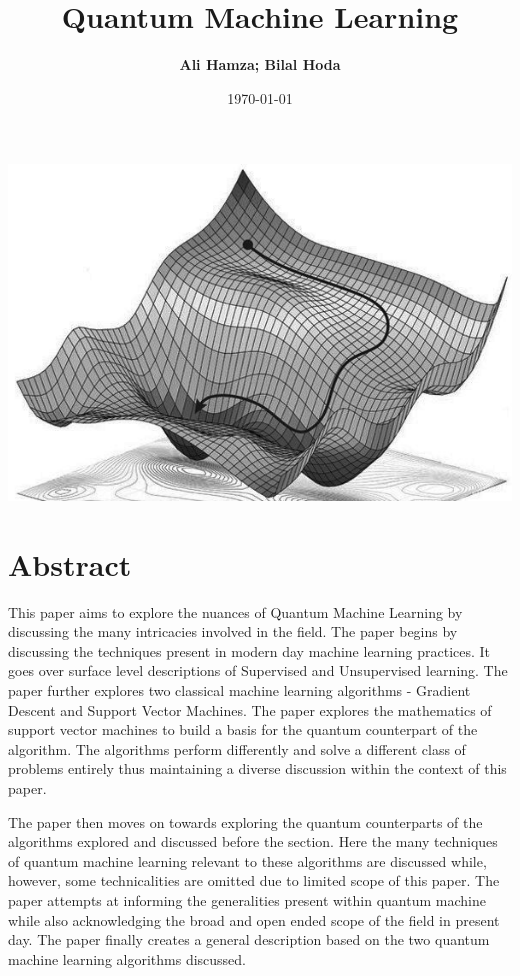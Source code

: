 \documentclass{article}
\title{\textbf{\Huge{Quantum Machine Learning}}}
\author{\textbf{\Large {Ali Hamza; Bilal Hoda}}}
\date{\today}
\begin{document}
    \maketitle
    \begin{center}
        \includegraphics[scale = 0.5]{images/title2.jpg}    
    \end{center}

\newpage

\tableofcontents
\newpage

\section{Abstract}
\par
This paper aims to explore the nuances of Quantum Machine Learning by discussing the many intricacies involved in the field. The paper begins by discussing the techniques present in modern day machine learning practices. It goes over surface level descriptions of Supervised and Unsupervised learning. The paper further explores two classical machine learning algorithms - Gradient Descent and Support Vector Machines. The paper explores the mathematics of support vector machines to build a basis for the quantum counterpart of the algorithm. The algorithms perform differently and solve a different class of problems entirely thus maintaining a diverse discussion within the context of this paper. 
\par
The paper then moves on towards exploring the quantum counterparts of the algorithms explored and discussed before the section. Here the many techniques of quantum machine learning relevant to these algorithms are discussed while, however, some technicalities are omitted due to limited scope of this paper. The paper attempts at informing the generalities present within quantum machine  while also acknowledging the broad and open ended scope of the field in present day. The paper finally creates a general description based on the two quantum machine learning algorithms discussed.
\newpage
\end{document}
